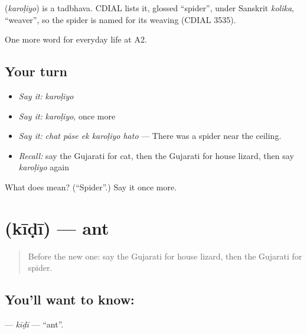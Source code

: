 \begin{cousinweb}
\textbf{} (\emph{karoḷiyo}) is a tadbhava. CDIAL lists it, glossed \textquotedblleft{}spider\textquotedblright{}, under Sanskrit \emph{kolika}, \textquotedblleft{}weaver\textquotedblright{}, so the spider is named for its weaving (CDIAL 3535).
\end{cousinweb}

\begin{grammarlens}[title={What you've built}]
One more word for everyday life at A2.
\end{grammarlens}

\subsection*{Your turn}
\begin{itemize}
\raggedright
  \item \emph{Say it:} \emph{karoḷiyo}
  \item \emph{Say it:} \emph{karoḷiyo}, once more
  \item \emph{Say it:} \emph{chat pāse ek karoḷiyo hato} — There was a spider near the ceiling.
  \item \emph{Recall:} say the Gujarati for cat, then the Gujarati for house lizard, then say \emph{karoḷiyo} again
\end{itemize}

\begin{tcolorbox}[breakable,colback=teal!4,colframe=teal!35!black,title={Before you move on}]
What does  mean? (\textquotedblleft{}Spider\textquotedblright{}.) Say it once more.
\end{tcolorbox}
\section[\texorpdfstring{\gu{કીડી} (kīḍī)}{કીડી (kīḍī)}]{ (kīḍī) — ant}

\label{lesson:GU-C238-kidi}



\begin{quote}
Before the new one: say the Gujarati for house lizard, then the Gujarati for spider.
\end{quote}

\subsection*{You'll want to know: }
\textbf{} — \emph{kīḍī} — \textquotedblleft{}ant\textquotedblright{}.

